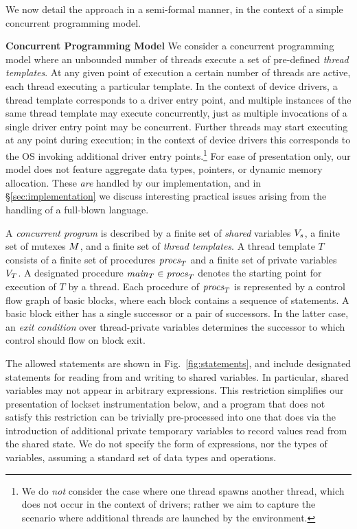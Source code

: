 We now detail the approach in a semi-formal manner, in the context of a simple concurrent programming model.

\noindent\textbf{Concurrent Programming Model }
%
We consider a concurrent programming model where an unbounded number of threads execute a set of pre-defined \emph{thread templates}.  At any given point of execution a certain number of threads are active, each thread executing a particular template.  In the context of device drivers, a thread template corresponds to a driver entry point, and multiple instances of the same thread template may execute concurrently, just as multiple invocations of a single driver entry point may be concurrent.  Further threads may start executing at any point during execution; in the context of device drivers this corresponds to the OS invoking additional driver entry points.\footnote{We do \emph{not} consider the case where one thread spawns another thread, which does not occur in the context of drivers; rather we aim to capture the scenario where additional threads are launched by the environment.}  For ease of presentation only, our model does not feature aggregate data types, pointers, or dynamic memory allocation.  These \emph{are} handled by our implementation, and in \S\ref{sec:implementation} we discuss interesting practical issues arising from the handling of a full-blown language.

A \emph{concurrent program} is described by a finite set of \emph{shared} variables $V_s$, a finite set of mutexes $M$, and a finite set of \emph{thread templates}.  A thread template $T$ consists of a finite set of procedures $\mathit{procs}_{T}$ and a finite set of private variables $V_{T}$.  A designated procedure $\mathit{main}_{T} \in \mathit{procs}_{T}$ denotes the starting point for execution of $T$ by a thread.  Each procedure of $\mathit{procs}_{T}$ is represented by a control flow graph of basic blocks, where each block contains a sequence of statements.  A basic block either has a single successor or a pair of successors.  In the latter case, an \emph{exit condition} over thread-private variables determines the successor to which control should flow on block exit.

The allowed statements are shown in Fig.~\ref{fig:statements}, and include designated statements for reading from and writing to shared variables.  In particular, shared variables may not appear in arbitrary expressions.  This restriction simplifies our presentation of lockset instrumentation below, and a program that does not satisfy this restriction can be trivially pre-processed into one that does via the introduction of additional private temporary variables to record values read from the shared state.  We do not specify the form of expressions, nor the types of variables, assuming a standard set of data types and operations.

